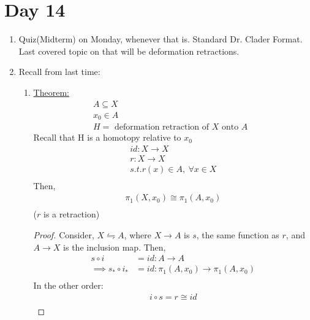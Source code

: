 \section{Day 14}
\begin{enumerate}
    \item Quiz(Midterm) on Monday, whenever that is. Standard Dr. Clader Format. Last
        covered topic on that will be deformation retractions.
    \item Recall from last time:
        \begin{enumerate}
            \item \underline{Theorem: }
                \begin{align*}
                    A\subseteq X\\
                    x_0 \in A\\
                    H=\text{ deformation retraction of $X$ onto $A$ }
                \end{align*}
                Recall that H is a homotopy relative to $x_0$
                \begin{align*}
                    id: X\rightarrow X\\
                    r: X \rightarrow X\\
                    s.t. r(x)\in A,\ \forall x\in X\\
                \end{align*}
                Then,
                \begin{align*}
                    \pi_1(X,x_0)\cong\pi_1(A,x_0)\\
                \end{align*}
                ($r$ is a retraction)
                \begin{proof}
                    Consider, $X \leftrightharpoons A$, where
                    $X\rightarrow A$ is $s$, the same function as $r$,
                    and $A\rightarrow X$ is the inclusion map. Then,
                    \begin{align*}
                        s\circ i &= id: A\rightarrow A\\
                        \implies s_* \circ i_* &= id: \pi_1(A,x_0)\rightarrow\pi_1(A,x_0)\\
                    \end{align*}
                    In the other order:
                    \begin{align*}
                        i\circ s = r\cong id\\

\end{align*}
\end{proof}
\end{enumerate}
\end{enumerate}
